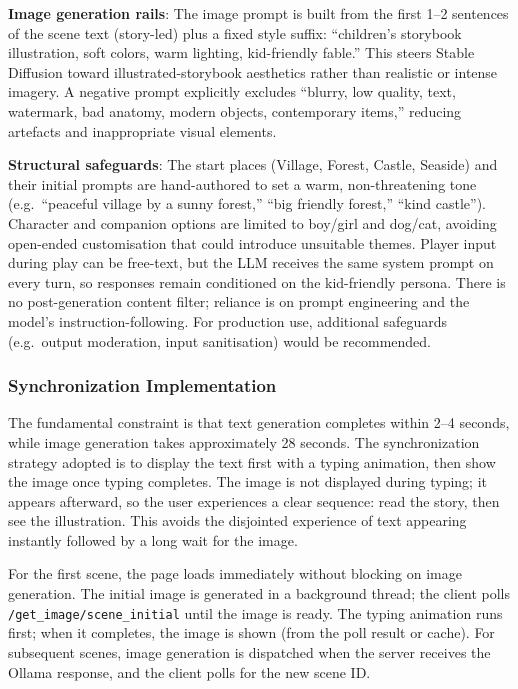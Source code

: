 \documentclass[12pt,a4paper]{article}
\newcommand{\breakablegetimage}[1]{\texttt{/get\_image/}\allowbreak\texttt{#1}}
\begin{document}
\textbf{Image generation rails}: The image prompt is built from the first 1--2 sentences of the scene text (story-led) plus a fixed style suffix: ``children's storybook illustration, soft colors, warm lighting, kid-friendly fable.'' This steers Stable Diffusion toward illustrated-storybook aesthetics rather than realistic or intense imagery. A negative prompt explicitly excludes ``blurry, low quality, text, watermark, bad anatomy, modern objects, contemporary items,'' reducing artefacts and inappropriate visual elements.

\textbf{Structural safeguards}: The start places (Village, Forest, Castle, Seaside) and their initial prompts are hand-authored to set a warm, non-threatening tone (e.g.\ ``peaceful village by a sunny forest,'' ``big friendly forest,'' ``kind castle''). Character and companion options are limited to boy/girl and dog/cat, avoiding open-ended customisation that could introduce unsuitable themes. Player input during play can be free-text, but the LLM receives the same system prompt on every turn, so responses remain conditioned on the kid-friendly persona. There is no post-generation content filter; reliance is on prompt engineering and the model's instruction-following. For production use, additional safeguards (e.g.\ output moderation, input sanitisation) would be recommended.

    \subsubsection{Synchronization Implementation}

The fundamental constraint is that text generation completes within 2--4 seconds, while image generation takes approximately 28 seconds. The synchronization strategy adopted is to display the text first with a typing animation, then show the image once typing completes. The image is not displayed during typing; it appears afterward, so the user experiences a clear sequence: read the story, then see the illustration. This avoids the disjointed experience of text appearing instantly followed by a long wait for the image.

For the first scene, the page loads immediately without blocking on image generation. The initial image is generated in a background thread; the client polls \breakablegetimage{scene\_initial} until the image is ready. The typing animation runs first; when it completes, the image is shown (from the poll result or cache). For subsequent scenes, image generation is dispatched when the server receives the Ollama response, and the client polls for the new scene ID.
\end{document}
